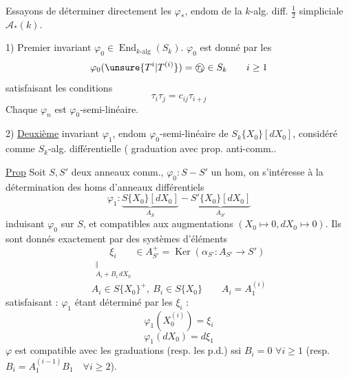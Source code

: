 Essayons de déterminer directement les $\varphi_*$, endom de la $k$-alg. diff. $\frac12$ simpliciale $\mathcal A_*(k)$.

1) Premier invariant $\varphi_0\in\operatorname{End}_{k\text{-alg}}(S_k)$.
 $\varphi_0$ est donné par les
\[
\varphi_0(\unsure{T^i|T^{(i)}})=\text{\textcircled{$\tau_i$}}\in S_k\qquad i\geq1
\]
satisfaisant les conditions
\[
\boxed{\tau_i\tau_j=c_{ij}\tau_{i+j}}
\]
Chaque $\varphi_n$ est $\varphi_0$-semi-linéaire.

2) \uline{Deuxième} invariant $\varphi_1$, endom $\varphi_0$-semi-linéaire de $S_k\{X_0\}[dX_0]$, considéré comme $S_k$-alg. différentielle ( graduation avec prop. anti-comm.\unsure{)}.

\uline{Prop} Soit $S,S'$ deux anneaux comm., $\varphi_0:S-S'$ un hom, on s'intéresse à la détermination des homs d'anneaux différentiels
\[
\varphi_1:\underbrace{S\{X_0\}[dX_0]}_{A_S}-\underbrace{S'\{X_0\}[dX_0]}_{A_{S'}}
\]
induisant $\varphi_0$ sur $S$, et compatibles aux augmentations $(X_0\longmapsto0,dX_0\longmapsto0)$. Ils sont donnés exactement par des systèmes d'éléments
\[
\underset{\substack{\Vert\\A_i+B_i\,dX_0}}{\xi_i}\in A_{S'}^+=\operatorname{Ker}(\alpha_{S'}:A_{S'}\longrightarrow S')
\]
\[
A_i\in S\{X_0\}^+,\ B_i\in S\{X_0\}\qquad A_i=A_1^{(i)}
\]
satisfaisant :
$\varphi_1$ étant déterminé par les $\xi_i$  :
\[
\varphi_1(X_0^{(i)})=\xi_i
\]
\[
\varphi_1(dX_0)=d\xi_1
\]
$\varphi$ est compatible avec les graduations (resp. les p.d.) ssi $B_i=0$ $\forall i\geq1$ (resp. $B_i=A_1^{(i-1)}B_1\quad\forall i\geq2$).
